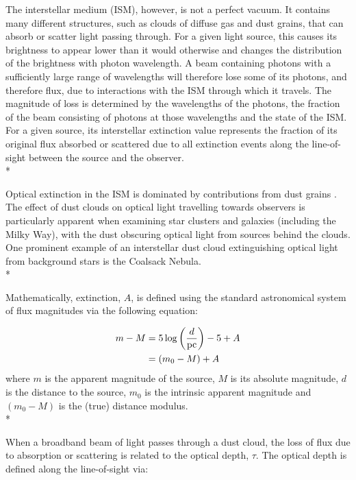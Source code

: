 \documentclass[12pt, a4paper]{report}
\begin{document}
The interstellar medium (ISM), however, is not a perfect vacuum. It contains many different structures, such as clouds of diffuse gas and dust grains, that can absorb or scatter light passing through. For a given light source, this causes its brightness to appear lower than it would otherwise and changes the distribution of the brightness with photon wavelength. A beam containing photons with a sufficiently large range of wavelengths will therefore lose some of its photons, and therefore flux, due to interactions with the ISM through which it travels. The magnitude of loss is determined by the wavelengths of the photons, the fraction of the beam consisting of photons at those wavelengths and the state of the ISM. For a given source, its interstellar extinction value represents the fraction of its original flux absorbed or scattered due to all extinction events along the line-of-sight between the source and the observer.\\*

Optical extinction in the ISM is dominated by contributions from dust grains \citep{2016Ap.....59..548G}. The effect of dust clouds on optical light travelling towards observers is particularly apparent when examining star clusters and galaxies (including the Milky Way), with the dust obscuring optical light from sources behind the clouds. One prominent example of an interstellar dust cloud extinguishing optical light from background stars is the Coalsack Nebula. \\*

Mathematically, extinction, $A$, is defined using the standard astronomical system of flux magnitudes via the following equation:

\begin{align}
\begin{split}
m - M &= 5\log\left(\frac{d}{\textnormal{pc}}\right) - 5 + A \\
      &= (m_{0} - M) + A
\end{split}
\label{ext_def_app_mag}
\end{align}
where $m$ is the apparent magnitude of the source, $M$ is its absolute magnitude, $d$ is the distance to the source, $m_{0}$ is the intrinsic apparent magnitude and $(m_{0} - M)$ is the (true) distance modulus. \\*


When a broadband beam of light passes through a dust cloud, the loss of flux due to absorption or scattering is related to the optical depth, $\tau$. The optical depth is defined along the line-of-sight via:
\end{document}
